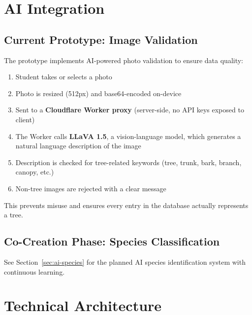 \documentclass[11pt,a4paper]{article}
\begin{document}
\section{AI Integration}

\subsection{Current Prototype: Image Validation}
The prototype implements AI-powered photo validation to ensure data quality:

\begin{enumerate}[nosep]
  \item Student takes or selects a photo
  \item Photo is resized (512px) and base64-encoded on-device
  \item Sent to a \textbf{Cloudflare Worker proxy} (server-side, no API keys exposed to client)
  \item The Worker calls \textbf{LLaVA 1.5}, a vision-language model, which generates a natural language description of the image
  \item Description is checked for tree-related keywords (tree, trunk, bark, branch, canopy, etc.)
  \item Non-tree images are rejected with a clear message
\end{enumerate}

This prevents misuse and ensures every entry in the database actually represents a tree.

\subsection{Co-Creation Phase: Species Classification}
See Section~\ref{sec:ai-species} for the planned AI species identification system with continuous learning.

\section{Technical Architecture}
\end{document}
